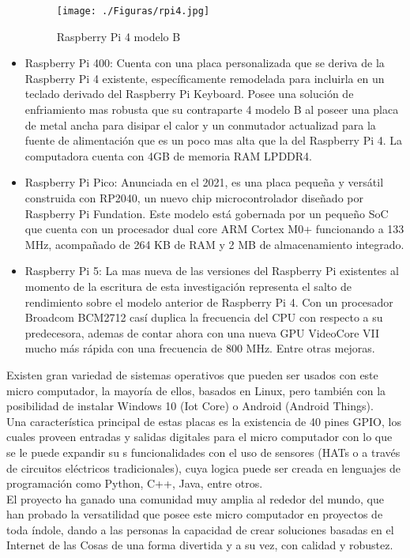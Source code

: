 \begin{itemize}
\begin{figure}[htb]
\centering
\texttt{[image: ./Figuras/rpi4.jpg]}
\caption{Raspberry Pi 4 modelo B}
\label{fig:rpi4}
\vspace*{-10pt}
\end{figure}

\item Raspberry Pi 400: Cuenta con una placa personalizada que se deriva de la Raspberry Pi 4 existente, específicamente remodelada para incluirla en un teclado derivado del Raspberry Pi Keyboard. Posee una solución de enfriamiento mas robusta que su contraparte 4 modelo B al poseer una placa de metal ancha para disipar el calor y un conmutador actualizad para la fuente de alimentación que es un poco mas alta que la del Raspberry Pi 4. La computadora cuenta con 4GB de memoria RAM LPDDR4.
\item Raspberry Pi Pico: Anunciada en el 2021, es una placa pequeña y versátil construida con RP2040, un nuevo chip microcontrolador diseñado por Raspberry Pi Fundation. Este modelo está gobernada por un pequeño SoC que cuenta con un procesador dual core ARM Cortex M0+ funcionando a 133 MHz, acompañado de 264 KB de RAM y 2 MB de almacenamiento integrado.
\item Raspberry Pi 5: La mas nueva de las versiones del Raspberry Pi existentes al momento de la escritura de esta investigación representa el salto de rendimiento sobre el modelo anterior de Raspberry Pi 4. Con un procesador  Broadcom BCM2712 casí duplica la frecuencia del CPU con respecto a su predecesora, ademas de contar ahora con una nueva GPU VideoCore VII mucho más rápida con una frecuencia de 800 MHz. Entre otras mejoras.
\end{itemize}
Existen gran variedad de sistemas operativos que pueden ser usados con este micro computador, la mayoría de ellos, basados en Linux, pero también con la posibilidad de instalar Windows 10 (Iot Core) o Android (Android Things).\\

Una característica principal de estas placas es la existencia de 40 pines GPIO, los cuales proveen entradas y salidas digitales para el micro computador con lo que se le puede expandir su s funcionalidades con el uso de sensores (HATs o a través de circuitos eléctricos tradicionales), cuya logica puede ser creada en lenguajes de programación como Python, C++, Java, entre otros.\\

El proyecto ha ganado una comunidad muy amplia al rededor del mundo, que han probado la versatilidad que posee este micro computador en proyectos de toda índole, dando a las personas la capacidad de crear soluciones basadas en el Internet de las Cosas de una forma divertida y a su vez, con calidad y robustez.

